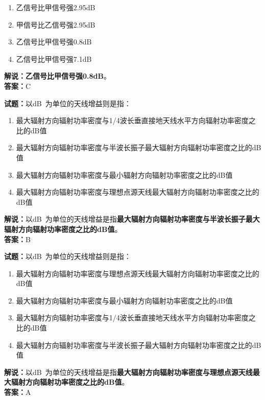 \documentclass{ctexbook}
\begin{document}
\begin{enumerate}[leftmargin=3em]
	\item 乙信号比甲信号强2.95\si{\dB}
	\item 甲信号比乙信号强2.95\si{\dB}
	\item 乙信号比甲信号强0.8\si{\dB}
	\item 乙信号比甲信号强7.1\si{\dB}
\end{enumerate}

\noindent\textbf{解说：乙信号比甲信号强0.8\si{\dB}}。\\\noindent\textbf{答案：}C


\bigskip


\noindent\textbf{试题：}以\unit[qualifier-mode=combine]{\deci\bel{}}为单位的天线增益则是指：

\begin{enumerate}[leftmargin=3em]
	\item 最大辐射方向辐射功率密度与1/4波长垂直接地天线水平方向辐射功率密度之比的\si{\dB}值
	\item 最大辐射方向辐射功率密度与半波长振子最大辐射方向辐射功率密度之比的\si{\dB}值
	\item 最大辐射方向辐射功率密度与最小辐射方向辐射功率密度之比的\si{\dB}值
	\item 最大辐射方向辐射功率密度与理想点源天线最大辐射方向辐射功率密度之比的\si{\dB}值
\end{enumerate}

\noindent\textbf{解说：}以\unit[qualifier-mode=combine]{\deci\bel{}}为单位的天线增益是指\textbf{最大辐射方向辐射功率密度与半波长振子最大辐射方向辐射功率密度之比的\si{\dB}值}。\\\noindent\textbf{答案：}B


\bigskip


\noindent\textbf{试题：}以\unit[qualifier-mode=combine]{\deci\bel{}}为单位的天线增益则是指：
\begin{enumerate}[leftmargin=3em]
	\item 最大辐射方向辐射功率密度与理想点源天线最大辐射方向辐射功率密度之比的\si{\dB}值
	\item 最大辐射方向辐射功率密度与最小辐射方向辐射功率密度之比的\si{\dB}值
	\item 最大辐射方向辐射功率密度与1/4波长垂直接地天线水平方向辐射功率密度之比的\si{\dB}值
	\item 最大辐射方向辐射功率密度与半波长振子最大辐射方向辐射功率密度之比的\si{\dB}值
\end{enumerate}

\noindent\textbf{解说：}以\unit[qualifier-mode=combine]{\deci\bel{}}为单位的天线增益是指\textbf{最大辐射方向辐射功率密度与理想点源天线最大辐射方向辐射功率密度之比的\si{\dB}值}。\\\noindent\textbf{答案：}A
\end{document}
